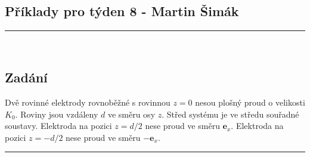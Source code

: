 \documentclass[12pt,a4paper]{report}
\renewcommand{\vec}{\boldsymbol}
\begin{document}
	
	
	\begin{center}
		\section*{Příklady pro týden 8 - Martin Šimák}
		\noindent\rule{13cm}{1.6pt} \\[5mm]
	\end{center}
	
	\subsection*{Zadání}
		Dvě rovinné  elektrody rovnoběžné s rovinnou $z = 0$ nesou plošný proud  o velikosti $K_0$. Roviny jsou vzdáleny $d$ ve směru osy $z$. Střed systému je ve středu souřadné soustavy. Elektroda na pozici $z = d/2$ nese proud ve směru $\vec e_x$. Elektroda na pozici $z = -d/2$ nese proud ve směru $- \vec e_x$. \\
	\noindent\rule{8cm}{0.4pt}
	
\end{document}
